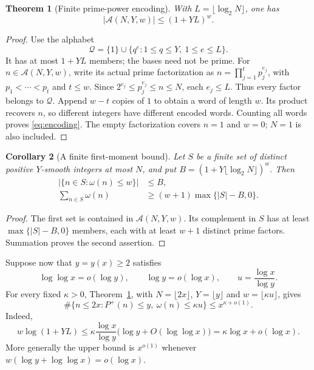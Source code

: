 \documentclass[11pt]{amsart}
\newtheorem{theorem}{Theorem}[section]
\newtheorem{corollary}[theorem]{Corollary}
\theoremstyle{definition}
\theoremstyle{remark}
\newcommand{\loglog}{\log\log}
\begin{document}
\begin{theorem}[Finite prime-power encoding]\label{thm:encoding}
With $L=\lfloor\log_2N\rfloor$, one has
\begin{equation}\label{eq:encoding}
 |\mathcal A(N,Y,w)|\le(1+YL)^w.
\end{equation}
\end{theorem}
\begin{proof}
Use the alphabet
\[
 \mathcal Q=\{1\}\cup\{q^e:1\le q\le Y,\ 1\le e\le L\}.
\]
It has at most $1+YL$ members; the bases need not be prime.
For $n\in\mathcal A(N,Y,w)$, write its actual prime factorization as
$n=\prod_{j=1}^t p_j^{e_j}$, with $p_1<\cdots<p_t$ and $t\le w$.
Since $2^{e_j}\le p_j^{e_j}\le n\le N$, each $e_j\le L$.
Thus every factor belongs to $\mathcal Q$. Append $w-t$ copies of $1$ to
obtain a word of length $w$. Its product recovers $n$, so different integers
have different encoded words. Counting all words proves \eqref{eq:encoding}.
The empty factorization covers $n=1$ and $w=0$; $N=1$ is also included.
\end{proof}

\begin{corollary}[A finite first-moment bound]\label{cor:moment}
Let $S$ be a finite set of distinct positive $Y$-smooth integers at most
$N$, and put $B=(1+Y\lfloor\log_2N\rfloor)^w$. Then
\begin{align}
 |\{n\in S:\omega(n)\le w\}|&\le B,\label{eq:lowcount}\\
 \sum_{n\in S}\omega(n)&\ge(w+1)\max\{|S|-B,0\}.
 \label{eq:momentfinite}
\end{align}
\end{corollary}
\begin{proof}
The first set is contained in $\mathcal A(N,Y,w)$. Its complement in $S$
has at least $\max\{|S|-B,0\}$ members, each with at least $w+1$ distinct
prime factors. Summation proves the second assertion.
\end{proof}

Suppose now that $y=y(x)\ge2$ satisfies
\begin{equation}\label{eq:yscale}
 \loglog x=o(\log y),\qquad \log y=o(\log x),
 \qquad u=\frac{\log x}{\log y}.
\end{equation}
For every fixed $\kappa>0$, Theorem~\ref{thm:encoding}, with
$N=\lfloor2x\rfloor$, $Y=\lfloor y\rfloor$ and
$w=\lfloor\kappa u\rfloor$, gives
\begin{equation}\label{eq:global-low}
 \#\{n\le2x:P^+(n)\le y,\ \omega(n)\le\kappa u\}
 \le x^{\kappa+o(1)}.
\end{equation}
Indeed,
\[
 w\log(1+YL)
 \le\kappa\frac{\log x}{\log y}
       \bigl(\log y+O(\loglog x)\bigr)
 =\kappa\log x+o(\log x).
\]
More generally the upper bound is $x^{o(1)}$ whenever
$w(\log y+\loglog x)=o(\log x)$.
\end{document}

